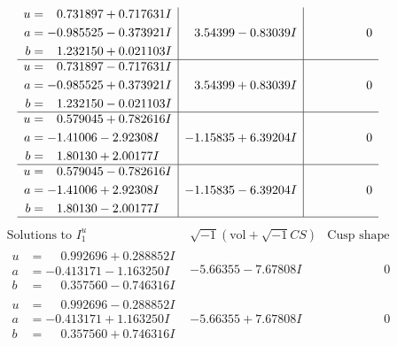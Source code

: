 \documentclass[1p]{elsarticle_modified}
\theoremstyle{definition}
\newcommand{\I}{\sqrt{-1}}
\begin{document}
$$\begin{array}{c|c|c}
\begin{aligned}
u &= \phantom{-}0.731897 + 0.717631 I \\
a &= -0.985525 - 0.373921 I \\
b &= \phantom{-}1.232150 + 0.021103 I\end{aligned}
 & \phantom{-}3.54399 - 0.83039 I & \phantom{-0.000000 } 0 \\ \hline\begin{aligned}
u &= \phantom{-}0.731897 - 0.717631 I \\
a &= -0.985525 + 0.373921 I \\
b &= \phantom{-}1.232150 - 0.021103 I\end{aligned}
 & \phantom{-}3.54399 + 0.83039 I & \phantom{-0.000000 } 0 \\ \hline\begin{aligned}
u &= \phantom{-}0.579045 + 0.782616 I \\
a &= -1.41006 - 2.92308 I \\
b &= \phantom{-}1.80130 + 2.00177 I\end{aligned}
 & -1.15835 + 6.39204 I & \phantom{-0.000000 } 0 \\ \hline\begin{aligned}
u &= \phantom{-}0.579045 - 0.782616 I \\
a &= -1.41006 + 2.92308 I \\
b &= \phantom{-}1.80130 - 2.00177 I\end{aligned}
 & -1.15835 - 6.39204 I & \phantom{-0.000000 } 0\\
 \hline 
 \end{array}$$\newpage$$\begin{array}{c|c|c}  
\text{Solutions to }I^u_{1}& \I (\text{vol} + \sqrt{-1}CS) & \text{Cusp shape}\\
 \hline 
\begin{aligned}
u &= \phantom{-}0.992696 + 0.288852 I \\
a &= -0.413171 - 1.163250 I \\
b &= \phantom{-}0.357560 - 0.746316 I\end{aligned}
 & -5.66355 - 7.67808 I & \phantom{-0.000000 } 0 \\ \hline\begin{aligned}
u &= \phantom{-}0.992696 - 0.288852 I \\
a &= -0.413171 + 1.163250 I \\
b &= \phantom{-}0.357560 + 0.746316 I\end{aligned}
 & -5.66355 + 7.67808 I & \phantom{-0.000000 } 0 \\ \hline\begin{aligned}

\end{aligned}
\end{array}$$
\end{document}

